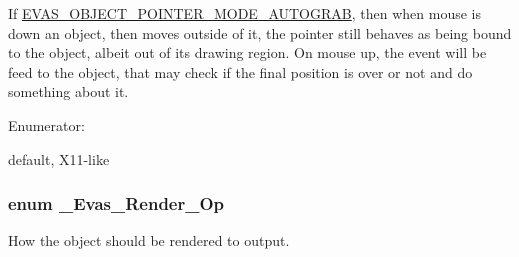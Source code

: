 If \hyperlink{group__Evas__Object__Group__Extras_gga822b2a69896ff21279debe2a417e3082a088ef2950aeb5a105c53decbbac82a28}{EVAS\_\-OBJECT\_\-POINTER\_\-MODE\_\-AUTOGRAB}, then when mouse is down an object, then moves outside of it, the pointer still behaves as being bound to the object, albeit out of its drawing region. On mouse up, the event will be feed to the object, that may check if the final position is over or not and do something about it. \begin{Desc}
\item[Enumerator: ]\par
\begin{description}
\item[{\em 
EVAS\_\-OBJECT\_\-POINTER\_\-MODE\_\-AUTOGRAB\label{group__Evas__Object__Group__Extras_gga822b2a69896ff21279debe2a417e3082a088ef2950aeb5a105c53decbbac82a28}
}]default, X11-\/like \end{description}
\end{Desc}

\subsubsection[{\_\-Evas\_\-Render\_\-Op}]{\setlength{\rightskip}{0pt plus 5cm}enum {\bf \_\-Evas\_\-Render\_\-Op}}\label{group__Evas__Object__Group__Extras_ga551375283a5e2b0abffd5f40582e9ce2}


How the object should be rendered to output. 

